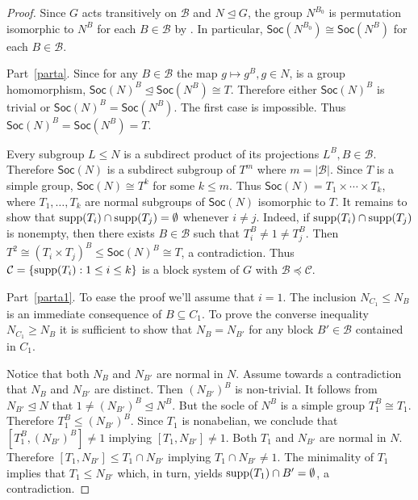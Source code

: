 \documentclass[11pt]{amsart}
\numberwithin{equation}{section}
\theoremstyle{definition}
\newcounter{case}
\def\supp{{\rm supp}}
\begin{document}
	\begin{proof}  Since $G$ acts transitively on ${\mathcal  B}$ and $N\unlhd G$, the group $N^{B_0}$ is permutation isomorphic to $N^B$ for each $B\in{\mathcal  B}$ by \cite[Theorem 1.6A (ii)]{DixonM1996}. In particular, $\mathsf{Soc}(N^{B_0})\cong \mathsf{Soc}(N^{B})$ for each $B\in{\mathcal  B}$.
		
		Part~\eqref{parta}. Since for any $B\in\mathcal{B}$ the map $g\mapsto g^B,g\in N$, is a group homomorphism, $\mathsf{Soc}(N)^B\unlhd \mathsf{Soc}(N^B)\cong T$. Therefore  either $\mathsf{Soc}(N)^B$ is trivial or $\mathsf{Soc}(N)^B = \mathsf{Soc}(N^B)$. The first case is impossible. Thus $\mathsf{Soc}(N)^B = \mathsf{Soc}(N^B) = T$.
		
		Every subgroup $L\leq N$ is a subdirect product of its projections $L^{B},B\in{\mathcal  B}$. Therefore $\mathsf{Soc}(N)$ is a subdirect subgroup of $T^m$ where $m=|{\mathcal  B}|$. Since $T$ is a simple group, $\mathsf{Soc}(N)\cong T^k$ for some $k\leq m$. Thus $\mathsf{Soc}(N) = T_1\times \cdots \times T_k$, where $T_1,\ldots,T_k$ are normal subgroups of $\mathsf{Soc}(N)$ isomorphic to $T$. It remains to show that $\supp(T_i)\cap \supp(T_j)=\emptyset$ whenever $i\neq j$.
		Indeed, if $\supp(T_i)\cap \supp(T_j)$ is nonempty, then there exists
		$B\in {\mathcal  B}$ such that $T_i^{B}\neq 1 \neq T_j^{B}$. Then $T^2\cong (T_i\times T_j)^{B}\leq \mathsf{Soc}(N)^{B} \cong T$, a contradiction.
		Thus ${\mathcal  C} = \{\supp(T_i):1\le i\le k\}$ is a block system of $G$ with ${\mathcal  B}\preceq{\mathcal  C}$.
		
		Part~\eqref{parta1}. To ease the proof we'll assume that $i=1$. The inclusion $N_{C_1}\leq N_{B}$ is an immediate consequence of $B\subseteq C_1$. To prove the converse inequality $N_{C_1}\geq N_{B}$ it is sufficient to show that $N_{B}=N_{B'}$ for any block $B'\in\mathcal{B}$ contained in $C_1$.
		
		Notice that both             $N_{B}$ and $N_{B'}$ are normal in $N$. Assume towards a contradiction that  $N_{B}$ and $N_{B'}$ are distinct. Then $(N_{B'})^{B}$ is non-trivial.
		It follows from $N_{B'}\trianglelefteq N$ that 
		$1\neq (N_{B'})^{B}\trianglelefteq N^{B}$. But the socle of $N^{B}$ is a simple group $T_1^{B}\cong T_1$. Therefore $T_1^{B}\leq (N_{B'})^{B}$. Since $T_1$ is nonabelian, we conclude that $[T_1^{B},(N_{B'})^{B}]\neq 1$ implying $[T_1,N_{B'}]\neq 1$. Both $T_1$ and $N_{B'}$ are normal in $N$. Therefore $[T_1,N_{B'}]\leq T_1\cap N_{B'}$ implying $T_1\cap N_{B'}\neq 1$. The minimality of $T_1$ implies that $T_1\leq N_{B'}$ which, in turn, yields $\supp(T_1)\cap B'=\emptyset$, a contradiction.  
		

\end{proof}
\end{document}
